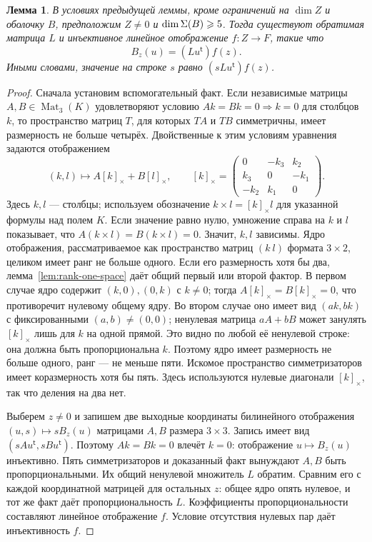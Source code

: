 \documentclass[11pt,a4paper]{article}
\numberwithin{equation}{section}
\theoremstyle{plain}
\newtheorem{lemma}[theorem]{Лемма}
\theoremstyle{definition}
\DeclareMathOperator{\Mat}{Mat}\DeclareMathOperator{\Span}{span}
\begin{document}
\begin{lemma}\label{lem:five-sym}
В условиях предыдущей леммы, кроме ограничений на $\dim Z$ и оболочку
$B$, предположим $Z\ne0$ и $\dim\Sigma(B)\geqslant5$.
Тогда существуют обратимая матрица $L$ и инъективное линейное
отображение $f:Z\to F$, такие что
\begin{equation}\label{eq:factor}
 B_z(u)= (Lu^{\mathsf t}) f(z).
\end{equation}
Иными словами, значение на строке $s$ равно $(sLu^{\mathsf t})f(z)$.
\end{lemma}
\begin{proof}
Сначала установим вспомогательный факт. Если независимые матрицы
$A,B\in\Mat_3(K)$ удовлетворяют условию
$Ak=Bk=0\Rightarrow k=0$ для столбцов $k$, то пространство матриц $T$,
для которых $TA$ и $TB$ симметричны, имеет размерность не больше четырёх.
Двойственные к этим условиям уравнения задаются отображением
\[
 (k,l)\longmapsto A[k]_\times+B[l]_\times,\qquad
 [k]_\times=\begin{pmatrix}0&-k_3&k_2\\k_3&0&-k_1\\-k_2&k_1&0\end{pmatrix}.
\]
Здесь $k,l$ --- столбцы; используем обозначение
$k\times l=[k]_\times l$ для указанной формулы над полем $K$.
Если значение равно нулю, умножение справа на $k$ и $l$ показывает,
что $A(k\times l)=B(k\times l)=0$. Значит, $k,l$ зависимы.
Ядро отображения, рассматриваемое как пространство матриц $(k\ l)$
формата $3\times2$, целиком имеет ранг не больше одного.
Если его размерность хотя бы два, лемма~\ref{lem:rank-one-space}
даёт общий первый или второй фактор. В первом случае ядро содержит
$(k,0),(0,k)$ с $k\ne0$; тогда $A[k]_\times=B[k]_\times=0$,
что противоречит нулевому общему ядру. Во втором случае оно имеет вид
$(ak,bk)$ с фиксированными $(a,b)\ne(0,0)$; ненулевая матрица
$aA+bB$ может занулять $[k]_\times$ лишь для $k$ на одной прямой.
Это видно по любой её ненулевой строке: она должна быть пропорциональна $k$.
Поэтому ядро имеет размерность не больше одного, ранг --- не меньше пяти.
Искомое пространство симметризаторов имеет коразмерность хотя бы пять.
Здесь используются нулевые диагонали $[k]_\times$, так что деления
на два нет.

Выберем $z\ne0$ и запишем две выходные координаты билинейного
отображения $(u,s)\mapsto sB_z(u)$ матрицами $A,B$ размера $3\times3$.
Запись имеет вид $(sAu^{\mathsf t},sBu^{\mathsf t})$.
Поэтому $Ak=Bk=0$ влечёт $k=0$: отображение $u\mapsto B_z(u)$ инъективно.
Пять симметризаторов и доказанный факт вынуждают $A,B$ быть
пропорциональными. Их общий ненулевой множитель $L$ обратим.
Сравним его с каждой координатной матрицей для остальных $z$:
общее ядро опять нулевое, и тот же факт даёт пропорциональность $L$.
Коэффициенты пропорциональности составляют линейное отображение $f$.
Условие отсутствия нулевых пар даёт инъективность $f$.
\end{proof}
\end{document}
